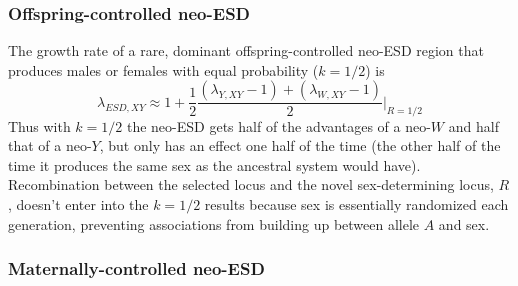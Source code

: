 \documentclass[12pt]{article}
\begin{document}
\subsubsection*{Offspring-controlled neo-ESD}

The growth rate of a rare, dominant offspring-controlled neo-ESD region that produces males or females with equal probability ($k=1/2$) is
\begin{equation}
\lambda_{ESD,XY} \approx 1 + \frac{1}{2}\frac{(\lambda_{Y,XY} - 1) + (\lambda_{W,XY} -1)}{2} \Big|_{R=1/2}
\end{equation}
Thus with $k=1/2$ the neo-ESD gets half of the advantages of a neo-$W$ and half that of a neo-$Y$, but only has an effect one half of the time (the other half of the time it produces the same sex as the ancestral system would have).  
Recombination between the selected locus and the novel sex-determining locus, $R$, doesn't enter into the $k=1/2$ results because sex is essentially randomized each generation, %
preventing associations from building up between allele $A$ and sex.  

\subsubsection*{Maternally-controlled neo-ESD}
\end{document}
